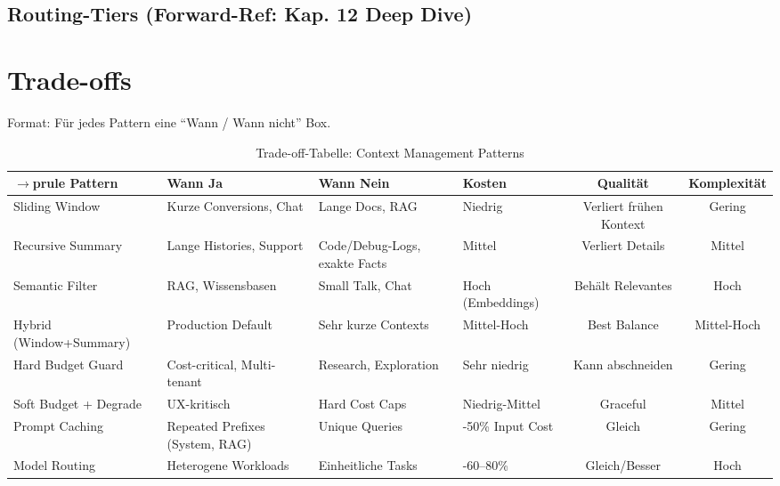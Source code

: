 
\subsection{Routing-Tiers (Forward-Ref: Kap. 12 Deep Dive)}
\label{sec:routing_tiers}


\section{Trade-offs}
\label{sec:tradeoffs}

Format: Für jedes Pattern eine ``Wann / Wann nicht'' Box.

\begin{table}[H]
\centering
\begin{tabularx}{\linewidth}{lXXXcc}
$\to$prule
\textbf{Pattern} & \textbf{Wann Ja} & \textbf{Wann Nein} & \textbf{Kosten} & \textbf{Qualität} & \textbf{Komplexität} \\
\midrule
Sliding Window & Kurze Conversions, Chat & Lange Docs, RAG & Niedrig & Verliert fr\"uhen Kontext & Gering \\
Recursive Summary & Lange Histories, Support & Code/Debug-Logs, exakte Facts & Mittel & Verliert Details & Mittel \\
Semantic Filter & RAG, Wissensbasen & Small Talk, Chat & Hoch (Embeddings) & Behält Relevantes & Hoch \\
Hybrid (Window+Summary) & Production Default & Sehr kurze Contexts & Mittel-Hoch & Best Balance & Mittel-Hoch \\
Hard Budget Guard & Cost-critical, Multi-tenant & Research, Exploration & Sehr niedrig & Kann abschneiden & Gering \\
Soft Budget + Degrade & UX-kritisch & Hard Cost Caps & Niedrig-Mittel & Graceful & Mittel \\
Prompt Caching & Repeated Prefixes (System, RAG) & Unique Queries & -50\% Input Cost & Gleich & Gering \\
Model Routing & Heterogene Workloads & Einheitliche Tasks & -60--80\% & Gleich/Besser & Hoch \\
\bottomrule
\end{tabularx}
\caption{Trade-off-Tabelle: Context Management Patterns}
\label{tab:token_tradeoffs}
\end{table}

